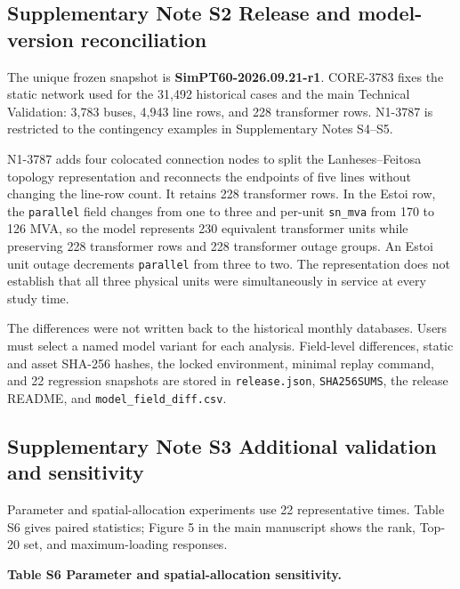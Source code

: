 \documentclass[
  10pt]{article}
\begin{document}
\subsection{Supplementary Note S2 \textbar{} Release and model-version
reconciliation}\label{supplementary-note-s2-release-and-model-version-reconciliation}

The unique frozen snapshot is \textbf{SimPT60-2026.09.21-r1}. CORE-3783
fixes the static network used for the 31,492 historical cases and the
main Technical Validation: 3,783 buses, 4,943 line rows, and 228
transformer rows. N1-3787 is restricted to the contingency examples in
Supplementary Notes S4--S5.

N1-3787 adds four colocated connection nodes to split the
Lanheses--Feitosa topology representation and reconnects the endpoints
of five lines without changing the line-row count. It retains 228
transformer rows. In the Estoi row, the \texttt{parallel} field changes
from one to three and per-unit \texttt{sn\_mva} from 170 to 126 MVA, so
the model represents 230 equivalent transformer units while preserving
228 transformer rows and 228 transformer outage groups. An Estoi unit
outage decrements \texttt{parallel} from three to two. The
representation does not establish that all three physical units were
simultaneously in service at every study time.

The differences were not written back to the historical monthly
databases. Users must select a named model variant for each analysis.
Field-level differences, static and asset SHA-256 hashes, the locked
environment, minimal replay command, and 22 regression snapshots are
stored in \texttt{release.json}, \texttt{SHA256SUMS}, the release
README, and \texttt{model\_field\_diff.csv}.

\subsection{Supplementary Note S3 \textbar{} Additional validation and
sensitivity}\label{supplementary-note-s3-additional-validation-and-sensitivity}

Parameter and spatial-allocation experiments use 22 representative
times. Table S6 gives paired statistics; Figure 5 in the main manuscript
shows the rank, Top-20 set, and maximum-loading responses.

\textbf{Table S6 \textbar{} Parameter and spatial-allocation
sensitivity.}
\end{document}
